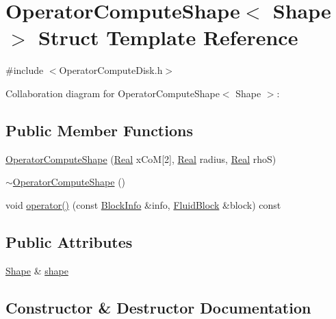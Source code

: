 \hypertarget{struct_operator_compute_shape}{}\section{Operator\+Compute\+Shape$<$ Shape $>$ Struct Template Reference}
\label{struct_operator_compute_shape}


{\ttfamily \#include $<$Operator\+Compute\+Disk.\+h$>$}



Collaboration diagram for Operator\+Compute\+Shape$<$ Shape $>$\+:
\subsection*{Public Member Functions}
\begin{DoxyCompactItemize}
\item 
\hyperlink{struct_operator_compute_shape_aac494d8ca3548fee7d82a74982ccbce3}{Operator\+Compute\+Shape} (\hyperlink{_h_d_f5_dumper_8h_a445a5f0e2a34c9d97d69a3c2d1957907}{Real} x\+Co\+M\mbox{[}2\mbox{]}, \hyperlink{_h_d_f5_dumper_8h_a445a5f0e2a34c9d97d69a3c2d1957907}{Real} radius, \hyperlink{_h_d_f5_dumper_8h_a445a5f0e2a34c9d97d69a3c2d1957907}{Real} rho\+S)
\item 
\hyperlink{struct_operator_compute_shape_ae3694d3bc1a6f5ad23e894fa4487c789}{$\sim$\+Operator\+Compute\+Shape} ()
\item 
void \hyperlink{struct_operator_compute_shape_af2aa4285819c392b00f63ccccb02b285}{operator()} (const \hyperlink{struct_block_info}{Block\+Info} \&info, \hyperlink{struct_fluid_block}{Fluid\+Block} \&block) const 
\end{DoxyCompactItemize}
\subsection*{Public Attributes}
\begin{DoxyCompactItemize}
\item 
\hyperlink{class_shape}{Shape} \& \hyperlink{struct_operator_compute_shape_a03556ff9f531396746e5bc7008f31bae}{shape}
\end{DoxyCompactItemize}


\subsection{Constructor \& Destructor Documentation}
\hypertarget{struct_operator_compute_shape_aac494d8ca3548fee7d82a74982ccbce3}{}
